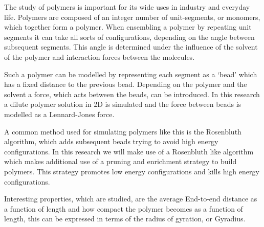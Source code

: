 The study of polymers is important for its wide uses in industry and everyday life. Polymers are composed of an integer number of unit-segments, or monomers, which together form a polymer. When ensembling a polymer by repeating unit segments it can take all sorts of configurations, depending on the angle between subsequent segments. This angle is determined under the influence of the solvent of the polymer and interaction forces between the molecules. 

Such a polymer can be modelled by representing each segment as a `bead' which has a fixed distance to the previous bead. Depending on the polymer and the solvent a force, which acts between the beads, can be introduced. In this research a dilute polymer solution in 2D is simulated and the force between beads is modelled as a Lennard-Jones force.

A common method used for simulating polymers like this is the Rosenbluth algorithm, which adds subsequent beads trying to avoid high energy configurations. In this research we will make use of a Rosenbluth like algorithm which makes additional use of a pruning and enrichment strategy to build polymers. This strategy promotes low energy configurations and kills high energy configurations. 

Interesting properties, which are studied, are the average End-to-end distance as a function of length and how compact the polymer becomes as a function of length, this can be expressed in terms of the radius of gyration, or Gyradius.  